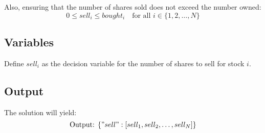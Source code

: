 \documentclass{article}
\begin{document}
Also, ensuring that the number of shares sold does not exceed the number owned:
\[
0 \leq sell_i \leq bought_i \quad \text{for all } i \in \{1, 2, \ldots, N\}
\]

\subsection*{Variables}
Define \( sell_i \) as the decision variable for the number of shares to sell for stock \( i \).

\subsection*{Output}
The solution will yield:
\[
\text{Output: } \{ "sell": [sell_1, sell_2, \ldots, sell_N] \}
\]
\end{document}
